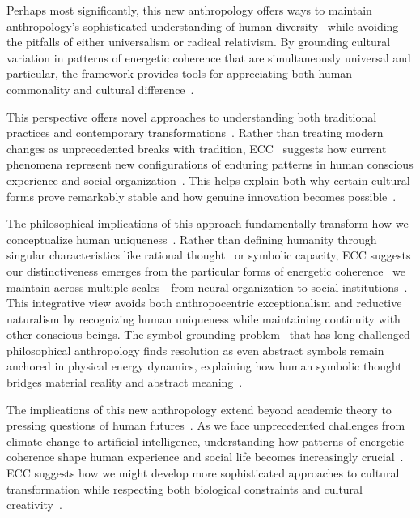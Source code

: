 Perhaps most significantly, this new anthropology offers ways to maintain anthropology's sophisticated understanding of human diversity~\cite{moore2011still, strathern2004partial} while avoiding the pitfalls of either universalism or radical relativism. By grounding cultural variation in patterns of energetic coherence that are simultaneously universal and particular, the framework provides tools for appreciating both human commonality and cultural difference~\cite{viveiros2014cannibal}.

This perspective offers novel approaches to understanding both traditional practices and contemporary transformations~\cite{tsing2015mushroom, ingold2011being}. Rather than treating modern changes as unprecedented breaks with tradition, ECC~ suggests how current phenomena represent new configurations of enduring patterns in human conscious experience and social organization~\cite{latour1993modern}. This helps explain both why certain cultural forms prove remarkably stable and how genuine innovation becomes possible~\cite{wagner2016invention, bateson2000steps}.

The philosophical implications of this approach fundamentally transform how we conceptualize human uniqueness~\cite{Cassirer1944, Brown1991}. Rather than defining humanity through singular characteristics like rational thought~ or symbolic capacity, ECC suggests our distinctiveness emerges from the particular forms of energetic coherence~ we maintain across multiple scales---from neural organization to social institutions~\cite{Heidegger1962, McGilchrist2019}. This integrative view avoids both anthropocentric exceptionalism and reductive naturalism by recognizing human uniqueness while maintaining continuity with other conscious beings. The symbol grounding problem~ that has long challenged philosophical anthropology finds resolution as even abstract symbols remain anchored in physical energy dynamics, explaining how human symbolic thought~ bridges material reality and abstract meaning~\cite{Husserl1991, Bruner1990}.

The implications of this new anthropology extend beyond academic theory to pressing questions of human futures~\cite{haraway2016staying, latour2017facing}. As we face unprecedented challenges from climate change to artificial intelligence, understanding how patterns of energetic coherence shape human experience and social life becomes increasingly crucial~\cite{tsing2015mushroom}. ECC suggests how we might develop more sophisticated approaches to cultural transformation while respecting both biological constraints and cultural creativity~\cite{ingold2013making, haraway2003companion}.

